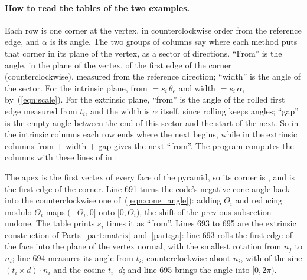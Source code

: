 \paragraph{How to read the tables of the two examples.} Each row is one corner at the vertex, in counterclockwise order from the reference edge, and $\alpha$ is its angle. The two groups of columns say where each method puts that corner in its plane of the vertex, as a sector of directions. ``From'' is the angle, in the plane of the vertex, of the first edge of the corner (counterclockwise), measured from the reference direction; ``width'' is the angle of the sector. For the intrinsic plane, from $= s_i\,\theta_e$ and width $= s_i\, \alpha$, by~(\ref{eqn:scale}). For the extrinsic plane, ``from'' is the angle of the rolled first edge measured from $t_i$, and the width is $\alpha$ itself, since rolling keeps angles; ``gap'' is the empty angle between the end of this sector and the start of the next. So in the intrinsic columns each row ends where the next begins, while in the extrinsic columns from $+$ width $+$ gap gives the next ``from''. The program computes the columns with these lines of  in :

The apex is the first vertex of every face of the pyramid, so its corner is , and  is the first edge of the corner. Line 691 turns the code's negative cone angle back into the counterclockwise one of~(\ref{eqn:cone_angle}): adding $\Theta_i$ and reducing modulo $\Theta_i$ maps $(-\Theta_i, 0]$ onto $[0, \Theta_i)$, the shift of the previous subsection undone. The table prints $s_i$ times it as ``from''. Lines 693 to 695 are the extrinsic construction of Parts~\ref{part:matrix} and~\ref{part:ga}: line 693 rolls the first edge of the face into the plane of the vertex normal, with the smallest rotation from $n_f$ to $n_i$; line 694 measures its angle from $t_i$, counterclockwise about $n_i$, with  of the sine $(t_i \times d) \cdot n_i$ and the cosine $t_i \cdot d$; and line 695 brings the angle into $[0, 2\pi)$.

